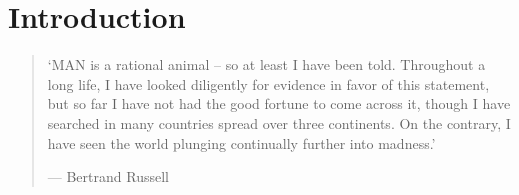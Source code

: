 \documentclass{ucthesis}
\begin{document}

\begin{frontmatter}%

\begin{dedication}
\null\vfil

\vfil\null
\end{dedication}


\tableofcontents%

\listoffigures%

\listoftables%

\end{frontmatter}%

\chapter{Introduction}

\begin{quotation}
`MAN is a rational animal -- so at least I have been told. Throughout a long
life, I have looked diligently for evidence in favor of this statement, but
so far I have not had the good fortune to come across it, though I have
searched in many countries spread over three continents. On the contrary, I
have seen the world plunging continually further into madness.'

\qquad \qquad \qquad \qquad \qquad \qquad \qquad \qquad \qquad --- Bertrand
Russell \cite[1951, pp.71]{Russell}
\end{quotation}
\end{document}
